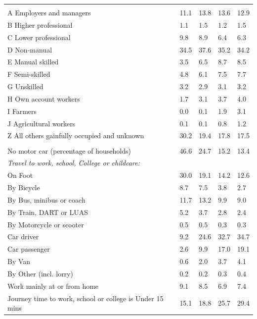 \documentclass{article}
\begin{document}
\begin{table}[h]
\begin{tabular}{KTTTT}
\hline
    \\ 
    \hline
A Employers and managers & 11.1& 13.8& 13.6& 12.9\\
B Higher professional & 1.1& 1.5& 1.2& 1.5\\
C Lower professional & 9.8& 8.9& 6.4& 6.3\\
D Non-manual & 34.5& 37.6& 35.2& 34.2\\
E Manual skilled & 3.5& 6.5& 8.7& 8.5\\
F Semi-skilled & 4.8& 6.1& 7.5& 7.7\\
G Unskilled & 3.2& 2.9& 3.1& 3.2\\
H Own account workers & 1.7& 3.1& 3.7& 4.0\\
I Farmers & 0.0& 0.1& 1.9& 3.1\\
J Agricultural workers & 0.1& 0.1& 0.8& 1.2\\
Z All others gainfully occupied and unknown & 30.2& 19.4& 17.8& 17.5\\
\hline
{}\hline
    \\ 
    \hline
No motor car (percentage of households) & 46.6& 24.7& 15.2& 
13.4\\
    \hline 
\emph{Travel to work, school, College or childcare:} & & & \\
\quad On Foot & 30.0& 19.1& 14.2& 12.6\\ 
\quad By Bicycle & 8.7& 7.5& 3.8& 2.7\\ 
\quad By Bus, minibus or coach & 11.7& 13.2&  9.9&  9.0\\
\quad By Train, DART or LUAS & 5.2& 3.7& 2.8& 2.4\\
\quad By Motorcycle or scooter & 0.5& 0.5& 0.3& 0.3\\
\quad Car driver &  9.2 & 24.6& 32.7& 34.7\\
\quad Car passenger &  2.6&  9.9& 17.0& 19.1\\
\quad By Van & 0.6& 2.0& 3.7& 4.1\\
\quad By Other (incl. lorry) & 0.2& 0.2& 0.3& 0.4\\
    \hline
Work mainly at or from home & 9.1& 8.5& 6.9& 7.4\\
Journey time to work, school or college is Under 15 mins & 15.1& 18.8& 25.7& 29.4\\

\end{tabular}
\end{table}
\end{document}
